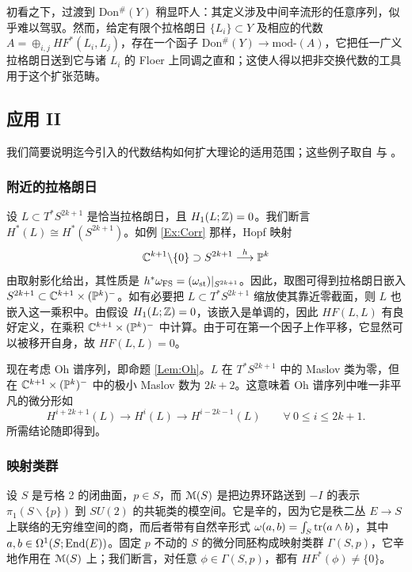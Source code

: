 初看之下，过渡到 Don$^{\#}(Y)$ 稍显吓人：其定义涉及中间辛流形的任意序列，似乎难以驾驭。然而，给定有限个拉格朗日 $\{L_i\} \subset Y$ 及相应的代数 $A = \oplus_{i,j} HF^*(L_i, L_j)$，存在一个函子 Don$^{\#}(Y) \rightarrow \mathrm{mod}$-$(A)$，它把任一广义拉格朗日送到它与诸 $L_i$ 的 Floer 上同调之直和；这使人得以把非交换代数的工具用于这个扩张范畴。

\subsection{应用 II}

我们简要说明迄今引入的代数结构如何扩大理论的适用范围；这些例子取自 \cite{Buhovsky} 与 \cite{Smith:HFQuadrics}。

\subsubsection{附近的拉格朗日}

设 $L \subset T^*S^{2k+1}$ 是恰当拉格朗日，且 $H_1(L;\mathbb{Z}) = 0$。我们断言 $H^*(L) \cong H^*(S^{2k+1})$。如例 \ref{Ex:Corr} 那样，Hopf 映射
\[
\mathbb{C}^{k+1}\backslash \{0\} \supset S^{2k+1} \stackrel{h}{\longrightarrow} \mathbb{P}^k
\]
由取射影化给出，其性质是 $h^*\omega_{\operatorname{FS}} = (\omega_{\operatorname{st}})|_{S^{2k+1}}$。因此，取图可得到拉格朗日嵌入 $S^{2k+1} \subset \mathbb{C}^{k+1} \times (\mathbb{P}^k)^-$。如有必要把 $L\subset T^*S^{2k+1}$ 缩放使其靠近零截面，则 $L$ 也嵌入这一乘积中。由假设 $H_1(L;\mathbb{Z}) = 0$，该嵌入是单调的，因此 $HF(L,L)$ 有良好定义，在乘积 $\mathbb{C}^{k+1} \times (\mathbb{P}^k)^-$ 中计算。由于可在第一个因子上作平移，它显然可以被移开自身，故 $HF(L,L)=0$。

现在考虑 Oh 谱序列，即命题 \ref{Lem:Oh}。$L$ 在 $T^*S^{2k+1}$ 中的 Maslov 类为零，但在 $\mathbb{C}^{k+1} \times (\mathbb{P}^k)^-$ 中的极小 Maslov 数为 $2k+2$。这意味着 Oh 谱序列中唯一非平凡的微分形如
\[
H^{i+2k+1}(L) \rightarrow H^i(L) \rightarrow H^{i-2k-1}(L) \qquad \forall \ 0 \leq i \leq 2k+1.
\]
所需结论随即得到。

\subsubsection{映射类群}

设 $S$ 是亏格 2 的闭曲面，$p
\in S$，而 $\EuScript{M}(S)$ 是把边界环路送到 $-I$ 的表示 $\pi_1(S\backslash \{p\})$ 到 $SU(2)$ 的共轭类的模空间。它是辛的，因为它是秩二丛 $E \rightarrow S$ 上联络的无穷维空间的商，而后者带有自然辛形式 $\omega(a,b) = \int_S \mathrm{tr}(a \wedge b)$，其中 $a,b \in \Omega^1(S;\mathrm{End}(E))$。固定 $p$ 不动的 $S$ 的微分同胚构成映射类群 $\Gamma(S,p)$，它辛地作用在 $\EuScript{M}(S)$ 上；我们断言，对任意 $\phi \in \Gamma(S,p)$，都有 $HF^*(\phi) \neq \{0\}$。


